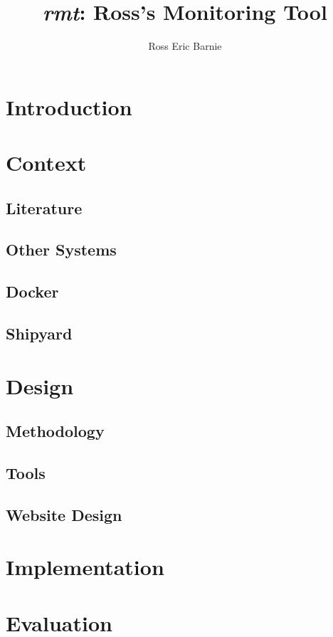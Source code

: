\documentclass{l4proj}
\title{\emph{rmt}: Ross's Monitoring Tool}
\author{Ross Eric Barnie}
\begin{document}
\maketitle
\tableofcontents



\chapter{Introduction}


\chapter{Context}
\section{Literature}
\section{Other Systems}
\section{Docker}
\section{Shipyard}

\chapter{Design}
\section{Methodology}

\section{Tools}

\section{Website Design}


\chapter{Implementation}

\chapter{Evaluation}
\end{document}
